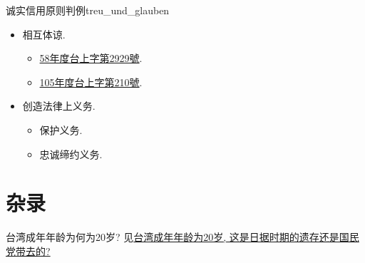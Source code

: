 \documentclass{article}
\begin{document}
\begin{example}{诚实信用原则判例}{treu_und_glauben}
\begin{itemize}
\begin{itemize}
        \end{itemize}
        \item 相互体谅.
        \begin{itemize}
            \item \href{https://judgment.judicial.gov.tw/FJUD/data.aspx?ty=JD&id=TPSV,58%2c%e5%8f%b0%e4%b8%8a%2c2929%2c19691002%2c1}{58年度台上字第2929號}.
            \item \href{https://judgment.judicial.gov.tw/FJUD/data.aspx?ty=JD&id=TPSV,105%2c%e5%8f%b0%e4%b8%8a%2c210%2c20160203}{105年度台上字第210號}.
        \end{itemize}
        \item 创造法律上义务.
        \begin{itemize}
            \item 保护义务.
            \item 忠诚缔约义务.
        \end{itemize}
    \end{itemize}
\end{example}

\section*{杂录}

台湾成年年龄为何为20岁? 见\href{https://www.zhihu.com/question/63447930}{台湾成年年龄为20岁, 这是日据时期的遗存还是国民党带去的?}

% 
% 
\end{document}
